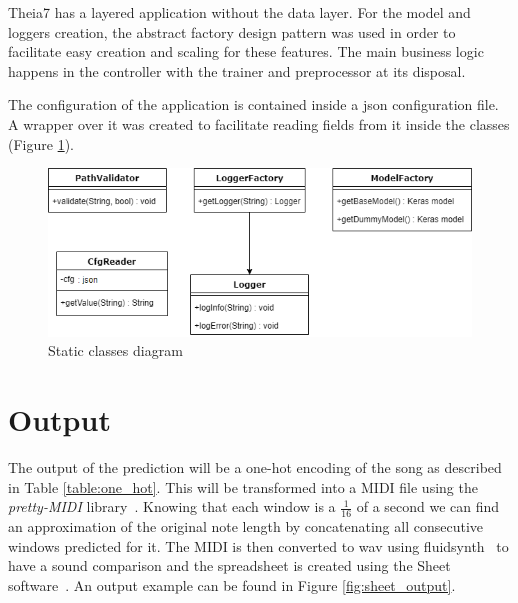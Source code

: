 Theia7 has a layered application without the data layer. For the model and loggers creation, the abstract factory design pattern was used in order to facilitate easy creation and scaling for these features. The main business logic happens in the controller with the trainer and preprocessor at its disposal.
\par

The configuration of the application is contained inside a json configuration file. A wrapper over it was created to facilitate reading fields from it inside the classes (Figure \ref{fig:utils_diag}).

\begin{figure}[H]
	\caption[Utils diagram]{ Static classes diagram }
	\centering
	\label{fig:utils_diag}
	\includegraphics[width=1\textwidth, height=1\textheight, keepaspectratio]{"resources/utils_diagram"}
\end{figure}

\section{Output}
The output of the prediction will be a one-hot encoding of the song as described in Table \ref{table:one_hot}. This will be transformed into a MIDI file using the \textit{pretty-MIDI} library~\cite{pretty_midi}. Knowing that each window is a $\frac{1}{16}$ of a second we can find an approximation of the original note length by concatenating all consecutive windows predicted for it. The MIDI is then converted to wav using fluidsynth~\cite{fluidsynth} to have a sound comparison and the spreadsheet is created using the Sheet software~\cite{sheet}. An output example can be found in Figure \ref{fig:sheet_output}.


